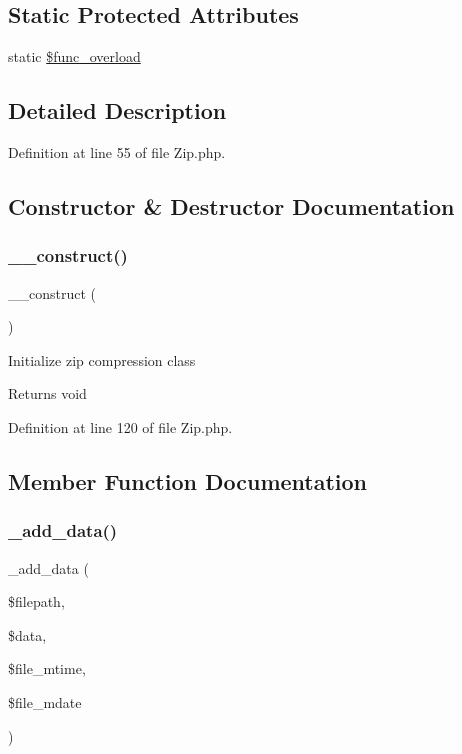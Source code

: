 \subsection*{Static Protected Attributes}
\begin{DoxyCompactItemize}
\item 
static \mbox{\hyperlink{class_c_i___zip_aef84be58d58a5895572c5689e56a1047}{\$func\+\_\+overload}}
\end{DoxyCompactItemize}


\subsection{Detailed Description}


Definition at line 55 of file Zip.\+php.



\subsection{Constructor \& Destructor Documentation}
\mbox{\label{class_c_i___zip_a095c5d389db211932136b53f25f39685}} 
\subsubsection{\texorpdfstring{\_\_construct()}{\_\_construct()}}
{\footnotesize\ttfamily \+\_\+\+\_\+construct (\begin{DoxyParamCaption}{ }\end{DoxyParamCaption})}

Initialize zip compression class

\begin{DoxyReturn}{Returns}
void 
\end{DoxyReturn}


Definition at line 120 of file Zip.\+php.



\subsection{Member Function Documentation}
\mbox{\label{class_c_i___zip_a4ff8a5ea57979ec1a44cc9e443acf26d}} 
\subsubsection{\texorpdfstring{\_add\_data()}{\_add\_data()}}
{\footnotesize\ttfamily \+\_\+add\+\_\+data (\begin{DoxyParamCaption}\item[{}]{\$filepath,  }\item[{}]{\$data,  }\item[{}]{\$file\+\_\+mtime,  }\item[{}]{\$file\+\_\+mdate }\end{DoxyParamCaption})\hspace{0.3cm}{\ttfamily [protected]}}

